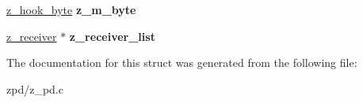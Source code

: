 \begin{DoxyCompactItemize}
\item 
\hypertarget{struct__internal_a53e8d16fef26644951273c0185115db3}{\hyperlink{group__zpd_ga678844ef26377b42232a67a8ef560819}{z\-\_\-hook\-\_\-byte} {\bfseries z\-\_\-m\-\_\-byte}}\label{struct__internal_a53e8d16fef26644951273c0185115db3}

\item 
\hypertarget{struct__internal_a7fa539109d72064e6ea5a2d09f42f071}{\hyperlink{struct__receiver}{z\-\_\-receiver} $\ast$ {\bfseries z\-\_\-receiver\-\_\-list}}\label{struct__internal_a7fa539109d72064e6ea5a2d09f42f071}

\end{DoxyCompactItemize}


The documentation for this struct was generated from the following file\-:\begin{DoxyCompactItemize}
\item 
zpd/z\-\_\-pd.\-c\end{DoxyCompactItemize}
